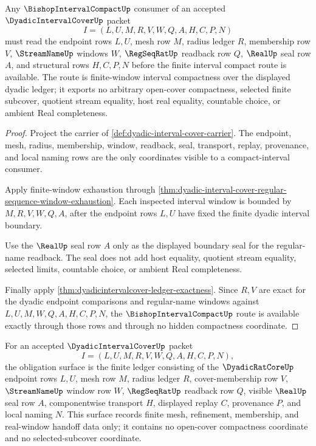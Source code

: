 \begin{theorem}
\label{thm:dyadic-interval-cover-bishop-interval-compact-route}
Any $\BishopIntervalCompactUp$ consumer of an accepted $\DyadicIntervalCoverUp$ packet
$$
I=(L,U,M,R,V,W,Q,A,H,C,P,N)
$$
must read the endpoint rows $L,U$, mesh row $M$, radius ledger $R$, membership row $V$, $\StreamNameUp$ windows $W$, $\RegSeqRatUp$ readback row $Q$, $\RealUp$ seal row $A$, and structural rows $H,C,P,N$ before the finite interval compact route is available. The route is finite-window interval compactness over the displayed dyadic ledger; it exports no arbitrary open-cover compactness, selected finite subcover, quotient stream equality, host real equality, countable choice, or ambient Real completeness.
\end{theorem}
\begin{proof}
Project the carrier of \autoref{def:dyadic-interval-cover-carrier}. The endpoint, mesh, radius, membership, window, readback, seal, transport, replay, provenance, and local naming rows are the only coordinates visible to a compact-interval consumer.

Apply finite-window exhaustion through \autoref{thm:dyadic-interval-cover-regular-sequence-window-exhaustion}. Each inspected interval window is bounded by $M,R,V,W,Q,A$, after the endpoint rows $L,U$ have fixed the finite dyadic interval boundary.

Use the $\RealUp$ seal row $A$ only as the displayed boundary seal for the regular-name readback. The seal does not add host equality, quotient stream equality, selected limits, countable choice, or ambient Real completeness.

Finally apply \autoref{thm:dyadicintervalcover-ledger-exactness}. Since $R,V$ are exact for the dyadic endpoint comparisons and regular-name windows against $L,U,M,W,Q,A,H,C,P,N$, the $\BishopIntervalCompactUp$ route is available exactly through those rows and through no hidden compactness coordinate.
\end{proof}

\begin{definition}
\label{def:dyadic-interval-cover-obligation-surface}
For an accepted $\DyadicIntervalCoverUp$ packet
$$
I=(L,U,M,R,V,W,Q,A,H,C,P,N),
$$
the obligation surface is the finite ledger consisting of the $\DyadicRatCoreUp$ endpoint rows $L,U$, mesh row $M$, radius ledger $R$, cover-membership row $V$, $\StreamNameUp$ window row $W$, $\RegSeqRatUp$ readback row $Q$, visible $\RealUp$ seal row $A$, componentwise transport $H$, displayed replay $C$, provenance $P$, and local naming $N$. This surface records finite mesh, refinement, membership, and real-window handoff data only; it contains no open-cover compactness coordinate and no selected-subcover coordinate.
\end{definition}

